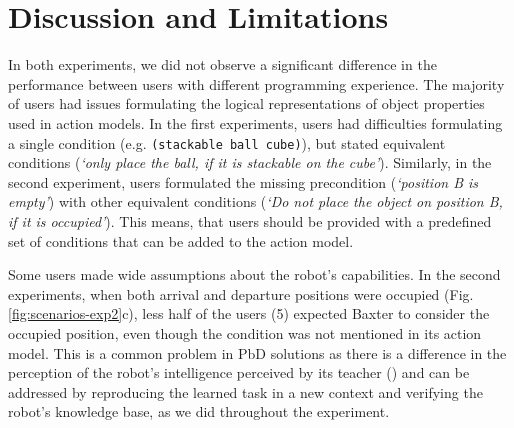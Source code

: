 






\section{Discussion and Limitations}
In both experiments, we did not observe a significant difference in the performance between users with different programming experience. 
The majority of users had issues formulating the logical representations of object properties used in action models. In the first experiments, users had difficulties formulating a single condition (e.g. \texttt{(stackable ball cube)}), but stated equivalent conditions (\textit{`only place the ball, if it is stackable on the cube'}).
Similarly, in the second experiment, users formulated the missing precondition (\textit{`position B is empty'}) with other equivalent conditions (\textit{`Do not place the object on position B, if it is occupied'}). This means, that users should be provided with a predefined set of conditions that can be added to the action model.

Some users made wide assumptions about the robot's capabilities. In the second experiments, when both arrival and departure positions were occupied (Fig. \ref{fig:scenarios-exp2}c), less half of the users (5) expected Baxter to consider the occupied position, even though the condition was not mentioned in its action model.
This is a common problem in PbD solutions as there is a difference in the perception of the robot's intelligence perceived by its teacher (\cite{suay2012practical}) and can be addressed by reproducing the learned task in a new context and verifying the robot's knowledge base, as we did throughout the experiment.

